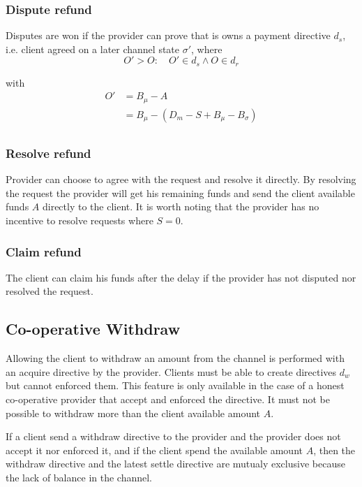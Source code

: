 \documentclass{llncs}
\begin{document}
\subsubsection{Dispute refund} Disputes are won if the provider can prove that is owns a payment directive $d_s$, i.e. client agreed on a later channel state $\sigma'$, where
$$O' > O : \quad O' \in d_s \land O \in d_r$$

with
\begin{equation*}
\begin{split}
    O' &= B_\mu - A \\
    &= B_\mu - (D_m - S + B_\mu - B_\sigma) \\
\end{split}
\end{equation*}

\subsubsection{Resolve refund} Provider can choose to agree with the request and resolve it directly. By resolving the request the provider will get his remaining funds and send the client available funds $A$ directly to the client. It is worth noting that the provider has no incentive to resolve requests where $S = 0$.

\subsubsection{Claim refund} The client can claim his funds after the delay if the provider has not disputed nor resolved the request.

\subsection{Co-operative Withdraw} Allowing the client to withdraw an amount from the channel is performed with an acquire directive by the provider. Clients must be able to create directives $d_w$ but cannot enforced them. This feature is only available in the case of a honest co-operative provider that accept and enforced the directive. It must not be possible to withdraw more than the client available amount $A$.

If a client send a withdraw directive to the provider and the provider does not accept it nor enforced it, and if the client spend the available amount $A$, then the withdraw directive and the latest settle directive are mutualy exclusive because the lack of balance in the channel.
\end{document}
